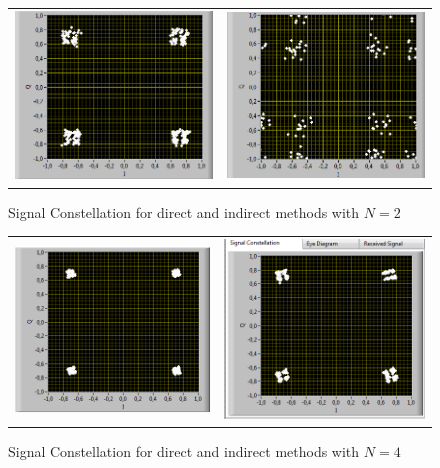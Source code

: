 \documentclass{article}
\begin{document}
        
        \begin{figure}[h]
        \centering
        \begin{tabular}{c c}
        \includegraphics[width = 0.4 \textwidth]{2_2_dir.PNG} & \includegraphics[width = 0.4 \textwidth]{2_2_indir.PNG}\\
        \end{tabular}
        \caption{Signal Constellation for direct and indirect methods with $N=2$ \label{N2}}
        \end{figure}
        
        \begin{figure}[h]
        \centering
        \begin{tabular}{c c}
        \includegraphics[width = 0.4 \textwidth]{4_4_dir.PNG} & \includegraphics[width = 0.4 \textwidth]{4_4_indir.PNG}\\
        \end{tabular}
        \caption{Signal Constellation for direct and indirect methods with $N=4$ \label{N4}}
        \end{figure}
        
\end{document}
